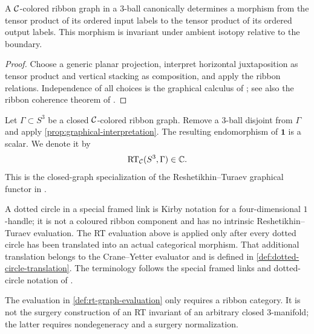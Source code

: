\begin{proposition}
\label{prop:graphical-interpretation}
A $\mathcal{C}$-colored ribbon graph in a $3$-ball canonically determines a morphism
from the tensor product of its ordered input labels to the tensor product of
its ordered output labels.  This morphism is invariant under ambient isotopy
relative to the boundary.
\end{proposition}

\begin{proof}
Choose a generic planar projection, interpret horizontal juxtaposition as
tensor product and vertical stacking as composition, and apply the ribbon
relations.  Independence of all choices is the graphical calculus of
\cite[Chapter~2, especially Sections~2.2--2.3]{BakalovKirillov2001}; see also
the ribbon coherence theorem of \cite{Shum1994}.
\end{proof}

\begin{definition}
\label{def:rt-graph-evaluation}
Let $\Gamma\subset S^3$ be a closed $\mathcal{C}$-colored ribbon graph.  Remove a
$3$-ball disjoint from $\Gamma$ and apply
\cref{prop:graphical-interpretation}.  The resulting endomorphism of
$\mathbf 1$ is a scalar.  We denote it by
\[
  \operatorname{RT}_{\mathcal{C}}(S^3,\Gamma)\in\mathbb C.
\]
This is the closed-graph specialization of the Reshetikhin--Turaev graphical
functor in \cite[Chapter~2, Section~2.3]{BakalovKirillov2001}.
\end{definition}

\begin{remark}
\label{rem:dotted-circles-not-rt-colours}
A dotted circle in a special framed link is Kirby notation for a
four-dimensional $1$-handle; it is not a coloured ribbon component and has
no intrinsic Reshetikhin--Turaev evaluation.  The RT evaluation above is
applied only after every dotted circle has been translated into an actual
categorical morphism.  That additional translation belongs to the
Crane--Yetter evaluator and is defined in
\cref{def:dotted-circle-translation}.  The terminology follows the special
framed links and dotted-circle notation of
\cite[Section~2.3.2 and Definition~2.49]{BarenzBarrett2018}.
\end{remark}

\begin{remark}
\label{rem:rt-graph-versus-manifold}
The evaluation in \cref{def:rt-graph-evaluation} only requires a ribbon
category.  It is not the surgery construction of an RT invariant of an
arbitrary closed $3$-manifold; the latter requires nondegeneracy and a
surgery normalization.
\end{remark}
